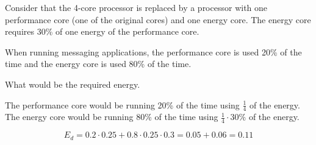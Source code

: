 \begin{acexercise}\end{acexercise}
Consider that the 4-core processor is replaced by a processor with one performance core (one of the original cores) and one energy core. The energy core requires 30\% of one energy of the performance core.

When running messaging applications, the performance core is used 20\% of the time and the
energy core is used 80\% of the time.

What would be the required energy.

\begin{acsolution}\end{acsolution}

The performance core would be running 20\% of the time using $\frac{1}{4}$ of the energy.
The energy core would be running 80\% of the time using $\frac{1}{4} \cdot 30\%$ of the energy.

\[
E_d = 0.2 \cdot 0.25 + 0.8 \cdot 0.25 \cdot 0.3 =
0.05 + 0.06 = 
0.11
\]

